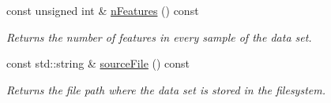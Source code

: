 \begin{CompactItemize}
const unsigned int \& \hyperlink{class_data_set_a4249f02ed870b2e76f0e73728229be2}{nFeatures} () const 
\begin{CompactList}\small\item\em Returns the number of features in every sample of the data set. \item\end{CompactList}\item 
const std::string \& \hyperlink{class_data_set_d7d233212f54f5c2764430b0cb1bea65}{sourceFile} () const 
\begin{CompactList}\small\item\em Returns the file path where the data set is stored in the filesystem. \item\end{CompactList}\end{CompactItemize}
